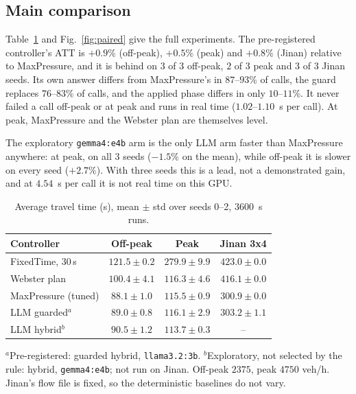 \documentclass[conference]{IEEEtran}
\newcommand{\V}[2]{\ensuremath{#2}}
\newcommand{\model}[1]{\texttt{#1}}
\begin{document}
\subsection{Main comparison}\label{sec:res-main}
Table~\ref{tab:main} and Fig.~\ref{fig:paired} give the full experiments. The pre-registered
controller's ATT is \V{f.off.llm.vs_mp}{+0.9}\% (off-peak), \V{f.peak.llm.vs_mp}{+0.5}\%
(peak) and \V{f.jinan.llm.vs_mp}{+0.8}\% (Jinan) relative to MaxPressure, and it is behind on
\V{p.off.llm.higher}{3} of 3 off-peak, \V{p.peak.llm.higher}{2} of 3 peak and
\V{p.jinan.llm.higher}{3} of 3 Jinan seeds. Its own answer differs from MaxPressure's in
\V{l.amb.llm.differs}{87}--\V{l.peak.llm.differs}{93}\% of calls, the guard replaces
\V{l.amb.llm.guard}{76}--\V{l.peak.llm.guard}{83}\% of calls, and the applied phase differs
in only \V{l.peak.llm.applied}{10}--\V{l.jinan.llm.applied}{11}\%. It never failed a call
off-peak or at peak and runs in real time (\V{l.peak.llm.lat}{1.02}--\V{l.jinan.llm.lat}{1.10}~s
per call). At peak, MaxPressure and the Webster plan are themselves level.

The exploratory \model{gemma4:e4b} arm is the only LLM arm faster than MaxPressure anywhere:
at peak, on all \V{p.peak.gem.lower}{3} seeds (\V{f.peak.gem.vs_mp}{-1.5}\% on the mean),
while off-peak it is slower on every seed (\V{f.off.gem.vs_mp}{+2.7}\%). With three seeds this
is a lead, not a demonstrated gain, and at \V{l.peak.gem.lat}{4.54}~s per call it is not real
time on this GPU.

\begin{table}[t]
\caption{Average travel time (s), mean $\pm$ std over seeds 0--2, \V{cfg.steps}{3600}~s runs.}
\label{tab:main}
\centering
\footnotesize
\begin{tabular}{@{}lccc@{}}
\toprule
Controller & Off-peak & Peak & Jinan 3x4 \\
\midrule
FixedTime, 30\,s & $121.5 \pm 0.2$ & $279.9 \pm 9.9$ & $423.0 \pm 0.0$ \\
Webster plan & $100.4 \pm 4.1$ & $116.3 \pm 4.6$ & $416.1 \pm 0.0$ \\
MaxPressure (tuned) & $88.1 \pm 1.0$ & $115.5 \pm 0.9$ & $300.9 \pm 0.0$ \\
\midrule
LLM guarded$^{a}$ & $89.0 \pm 0.8$ & $116.1 \pm 2.9$ & $303.2 \pm 1.1$ \\
LLM hybrid$^{b}$ & $90.5 \pm 1.2$ & $113.7 \pm 0.3$ & -- \\
\bottomrule
\end{tabular}
\par\vspace{2pt}
\parbox{\columnwidth}{\scriptsize $^{a}$Pre-registered: guarded hybrid, \model{llama3.2:3b}.
$^{b}$Exploratory, not selected by the rule: hybrid, \model{gemma4:e4b}; not run on Jinan.
Off-peak \V{cal.offpeak}{2375}, peak \V{cal.peak}{4750} veh/h. Jinan's flow file is fixed, so
the deterministic baselines do not vary.}
\end{table}
\end{document}
